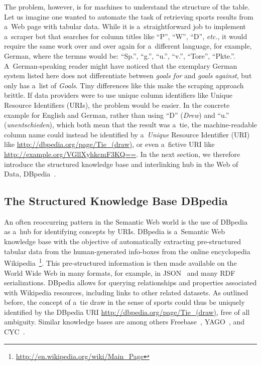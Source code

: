 The problem, however, is for machines to understand
the structure of the table.
Let us imagine one wanted to automate the task
of retrieving sports results from a~Web page with tabular data.
While it is a~straightforward job to implement
a~scraper bot that searches for column titles
like ``P'', ``W'', ``D'', \emph{etc.},
it would require the same work over and over again
for a~different language,
for example, German, where the termns would be:
``Sp.'', ``g.'', ``u.'', ``v.'', ``Tore'', ``Pkte.''.
A~German-speaking reader might have noticed
that the exemplary German system listed here
does not differentiate between \emph{goals for}
and \emph{goals against}, but only has a~list of \emph{Goals}.
Tiny differences like this make the scraping approach brittle.
If data providers were to use unique column identifiers like
Unique Resource Identifiers (URIs),
the problem would be easier.
In the concrete example for English and German,
rather than using ``D'' (\emph{Drew})
and ``u.'' (\emph{unentschieden}),
which both mean that the result was a~tie,
the machine-readable column name could instead be identified by
a~\emph{Unique} Resource Identifier (URI) like
\url{http://dbpedia.org/page/Tie_(draw)},
or even a~fictive URI like \url{http://example.org/VGllXyhkcmF3KQ==}.
In the next section, we therefore introduce
the structured knowledge base and interlinking hub
in the Web of Data, DBpedia~\cite{auer2007dbpedia}.

\subsection{The Structured Knowledge Base DBpedia}

An often reoccurring pattern
in the Semantic Web world
is the use of DBpedia~\cite{auer2007dbpedia}
as a~hub for identifying concepts by URIs.
DBpedia is a~Semantic Web knowledge base
with the objective of automatically extracting
pre-structured tabular data from the human-generated info-boxes
from the online encyclopedia
Wikipedia~\footnote{\url{http://en.wikipedia.org/wiki/Main_Page}}.
This pre-structured information is then made available
on the World Wide Web in many formats,
for example, in JSON~\cite{crockford2006json}
and many RDF~\cite{klyne2004rdf} serializations.
DBpedia allows for querying relationships
and properties associated with Wikipedia resources,
including links to other related datasets.
As outlined before, the concept of a~tie draw
in the sense of sports could thus be uniquely identified
by the DBpedia URI \url{http://dbpedia.org/page/Tie_(draw)},
free of all ambiguity.
Similar knowledge bases are among others
Freebase~\cite{markoff2007freebase},
YAGO~\cite{suchanek2007yago}, and CYC~\cite{lenat1995cyc}.

